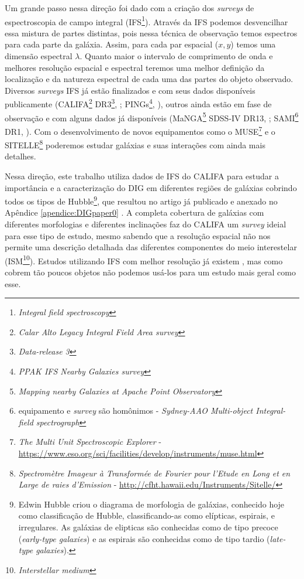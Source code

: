 Um grande passo nessa direção foi dado com a criação dos {\em surveys} de espectroscopia de campo integral (IFS\footnote{{\em Integral field spectroscopy}}). Através da IFS podemos desvencilhar essa mistura de partes distintas, pois nessa técnica de observação temos espectros para cada parte da galáxia. Assim, para cada par espacial ($x,y$) temos uma dimensão espectral $\lambda$. Quanto maior o intervalo de comprimento de onda  e melhores resolução espacial e espectral teremos uma melhor definição da localização e da natureza espectral de cada uma das partes do objeto observado. Diversos {\em surveys} IFS já estão finalizados e com seus dados disponíveis publicamente (CALIFA\footnote{\em Calar Alto Legacy Integral Field Area survey} DR3\footnote{\em Data-release 3}, \citealt{SFSanchez.DR3.2016}; PINGs\footnote{\em PPAK IFS Nearby Galaxies survey}, \citealt{RosalesOrtega.etal.2010}), outros ainda estão em fase de observação e com alguns dados já disponíveis (MaNGA\footnote{\em Mapping nearby Galaxies at Apache Point Observatory} SDSS-IV DR13, \citealt{MaNGADR1.2017}; SAMI\footnote{equipamento e {\em survey} são homônimos - {\em Sydney-AAO Multi-object Integral-field spectrograph}} DR1, \citealt{SAMIDR1.2017}). Com o desenvolvimento de novos equipamentos como o MUSE\footnote{{\em The Multi Unit Spectroscopic Explorer} - \href{https://www.eso.org/sci/facilities/develop/instruments/muse.html}{https://www.eso.org/sci/facilities/develop/instruments/muse.html}} e o SITELLE\footnote{{\em Spectromètre Imageur à Transformée de Fourier pour l'Etude en Long et en Large de raies d'Emission} - \href{http://cfht.hawaii.edu/Instruments/Sitelle/}{http://cfht.hawaii.edu/Instruments/Sitelle/}} poderemos estudar galáxias e suas interações com ainda mais detalhes.

Nessa direção, este trabalho utiliza dados de IFS do CALIFA para estudar a importância e a caracterização do DIG em diferentes regiões de galáxias cobrindo todos os tipos de Hubble\footnote{Edwin Hubble criou o diagrama de morfologia de galáxias, conhecido hoje como classificação de Hubble, classificando-as como elípticas, espirais, e irregulares. As galáxias de elipticas são conhecidas como de tipo precoce ({\em early-type galaxies}) e as espirais são conhecidas como de tipo tardio ({\em late-type galaxies}).}, que resultou no artigo já publicado e anexado no Apêndice \ref{apendice:DIGpaper0} \citep{Lacerda.etal.2018}. A completa cobertura de galáxias com diferentes morfologias e diferentes inclinações faz do CALIFA um {\em survey} ideial para esse tipo de estudo, mesmo sabendo que a resolução espacial não nos permite uma descrição detalhada das diferentes componentes do meio interestelar (ISM\footnote{\em Interstellar medium}). Estudos utilizando IFS com melhor resolução já existem \citep{Sanchez.etal.2015MUSE, Vogt.etal.2017a, RousseauNepton.etal.2017}, mas como cobrem tão poucos objetos não podemos usá-los para um estudo mais geral como esse.


